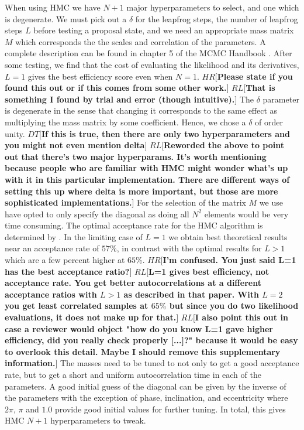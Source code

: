 \documentclass{aa}
\def\memohr#1{\color{blue}$HR[${\bf #1}$]$ \color{black}}
\def\memodt#1{\color{green}$DT[${\bf #1}$]$ \color{black}}
\def\memorl#1{\color{gray}$RL[${\bf #1}$]$ \color{black}}
\begin{document}
When using HMC we have $N+1$ major hyperparameters to select, and one which is degenerate. 
We must pick out a $\delta$ for the leapfrog steps, the number of leapfrog steps $L$ before testing a proposal state, and we need an appropriate mass matrix $M$ which corresponds the the scales and correlation of the parameters. 
A complete description can be found in chapter 5 of the MCMC Handbook \cite{1206.1901}. 
After some testing, we find that the cost of evaluating the likelihood and its derivatives, $L=1$ gives the best efficiency score even when $N=1$.
\memohr{Please state if you found this out or if this comes from some other work.}
\memorl{That is something I found by trial and error (though intuitive).}
The $\delta$ parameter is degenerate in the sense that changing it corresponds to the same effect as multiplying the mass matrix by some coefficient.
Hence, we chose a $\delta$ of order unity. \memodt{If this is true, then there are only two hyperparameters and you might not even mention delta} \memorl{Reworded the above to point out that there's two major hyperparams. It's worth mentioning because people who are familiar with HMC might wonder what's up with it in this particular implementation. There are different ways of setting this up where delta is more important, but those are more sophisticated implementations.}
For the selection of the matrix $M$ we use have opted to only specify the diagonal as doing all $N^2$ elements would be very time consuming.
The optimal acceptance rate for the HMC algorithm is determined by \cite{1001.4460}. 
In the limiting case of $L=1$ we obtain best theoretical results near an acceptance rate of $57\%$, in contrast with the optimal results for $L>1$ which are a few percent higher at $65\%$. 
\memohr{I'm confused. You just said L=1 has the best acceptance ratio?}
\memorl{L=1 gives best efficiency, not acceptance rate. You get better autocorrelations at a different acceptance ratios with $L>1$ as described in that paper. With $L=2$ you get least correlated samples at $65\%$ but since you do two likelihood evaluations, it does not make up for that.}
\memorl{I also point this out in case a reviewer would object "how do you know L=1 gave higher efficiency, did you really check properly [...]?" because it would be easy to overlook this detail. Maybe I should remove this supplementary information.}
The masses need to be tuned to not only to get a good acceptance rate, but to get a short and uniform autocorrelation time in each of the parameters.
A good initial guess of the diagonal can be given by the inverse of the parameters with the exception of phase, inclination, and eccentricity where $2 \pi$, $\pi$ and $1.0$ provide good initial values for further tuning.
In total, this gives HMC $N + 1$ hyperparameters to tweak.
\end{document}
